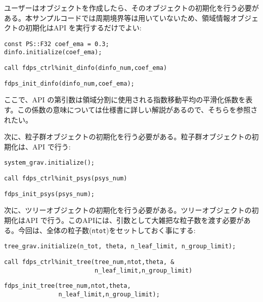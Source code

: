 ユーザーはオブジェクトを作成したら、そのオブジェクトの初期化を行う必要がある。本サンプルコードでは周期境界等は用いていないため、領域情報オブジェクトの初期化はAPI \initDinfo を実行するだけでよい:
\ifCpp%
\begin{lstlisting}[caption=領域クラスの初期化]
const PS::F32 coef_ema = 0.3;
dinfo.initialize(coef_ema);
\end{lstlisting}
\endifCpp
\ifFtn%
\begin{lstlisting}[caption=領域オブジェクトの初期化]
call fdps_ctrl%init_dinfo(dinfo_num,coef_ema)
\end{lstlisting}
\endifFtn
\ifC%
\begin{lstlisting}[caption=領域オブジェクトの初期化]
fdps_init_dinfo(dinfo_num,coef_ema);
\end{lstlisting}
\endifC
ここで、API \initDinfo の第引数は領域分割に使用される指数移動平均の平滑化係数を表す。この係数の意味については仕様書に詳しい解説があるので、そちらを参照されたい。

次に、粒子群オブジェクトの初期化を行う必要がある。粒子群オブジェクトの初期化は、API \initPsys で行う:
\ifCpp%
\begin{lstlisting}[caption=粒子群クラスの初期化]
system_grav.initialize();
\end{lstlisting}
\endifCpp
\ifFtn%
\begin{lstlisting}[caption=粒子群オブジェクトの初期化]
call fdps_ctrl%init_psys(psys_num)
\end{lstlisting}
\endifFtn
\ifC%
\begin{lstlisting}[caption=粒子群オブジェクトの初期化]
fdps_init_psys(psys_num);
\end{lstlisting}
\endifC

次に、ツリーオブジェクトの初期化を行う必要がある。ツリーオブジェクトの初期化はAPI \initTree で行う。このAPIには、引数として大雑把な粒子数を渡す必要がある。今回は、全体の粒子数(\texttt{ntot})をセットしておく事にする:
\ifCpp%
\begin{lstlisting}[caption=相互作用ツリークラスの初期化]
tree_grav.initialize(n_tot, theta, n_leaf_limit, n_group_limit);
\end{lstlisting}
\endifCpp
\ifFtn%
\begin{lstlisting}[caption=ツリーオブジェクトの初期化]
call fdps_ctrl%init_tree(tree_num,ntot,theta, &
                         n_leaf_limit,n_group_limit)
\end{lstlisting}
\endifFtn
\ifC%
\begin{lstlisting}[caption=ツリーオブジェクトの初期化]
fdps_init_tree(tree_num,ntot,theta,
               n_leaf_limit,n_group_limit);
\end{lstlisting}
\endifC

